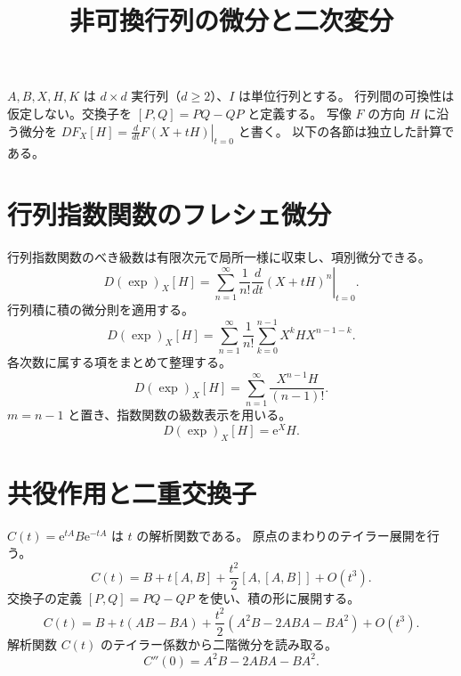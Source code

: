 \documentclass[a4paper,10pt]{ltjsarticle}
\title{非可換行列の微分と二次変分}
\author{}
\date{}
\begin{document}
\maketitle
$A,B,X,H,K$ は $d\times d$ 実行列（$d\geq2$）、$I$ は単位行列とする。
行列間の可換性は仮定しない。交換子を $[P,Q]=PQ-QP$ と定義する。
写像 $F$ の方向 $H$ に沿う微分を
$DF_X[H]=\left.\frac{d}{dt}F(X+tH)\right|_{t=0}$ と書く。
以下の各節は独立した計算である。

\section*{行列指数関数のフレシェ微分}
行列指数関数のべき級数は有限次元で局所一様に収束し、項別微分できる。
\begin{equation}
 D(\exp)_X[H]=\sum_{n=1}^{\infty}\frac{1}{n!}
 \left.\frac{d}{dt}(X+tH)^n\right|_{t=0}.
 \label{exp-series}
\end{equation}
行列積に積の微分則を適用する。
\begin{equation}
 D(\exp)_X[H]=\sum_{n=1}^{\infty}\frac{1}{n!}
 \sum_{k=0}^{n-1}X^k H X^{n-1-k}.
 \label{exp-product}
\end{equation}
各次数に属する項をまとめて整理する。
\begin{equation}
 D(\exp)_X[H]=\sum_{n=1}^{\infty}\frac{X^{n-1}H}{(n-1)!}.
 \label{exp-collected}
\end{equation}
$m=n-1$ と置き、指数関数の級数表示を用いる。
\begin{equation}
 D(\exp)_X[H]=\mathrm{e}^X H.
 \label{exp-closed}
\end{equation}

\section*{共役作用と二重交換子}
$C(t)=\mathrm{e}^{tA}B\mathrm{e}^{-tA}$ は $t$ の解析関数である。
原点のまわりのテイラー展開を行う。
\begin{equation}
 C(t)=B+t[A,B]+\frac{t^2}{2}[A,[A,B]]+O(t^3).
 \label{adj-series}
\end{equation}
交換子の定義 $[P,Q]=PQ-QP$ を使い、積の形に展開する。
\begin{equation}
 C(t)=B+t(AB-BA)+\frac{t^2}{2}(A^2B-2ABA-BA^2)+O(t^3).
 \label{adj-products}
\end{equation}
解析関数 $C(t)$ のテイラー係数から二階微分を読み取る。
\begin{equation}
 C''(0)=A^2B-2ABA-BA^2.
 \label{adj-second}
\end{equation}
\end{document}
